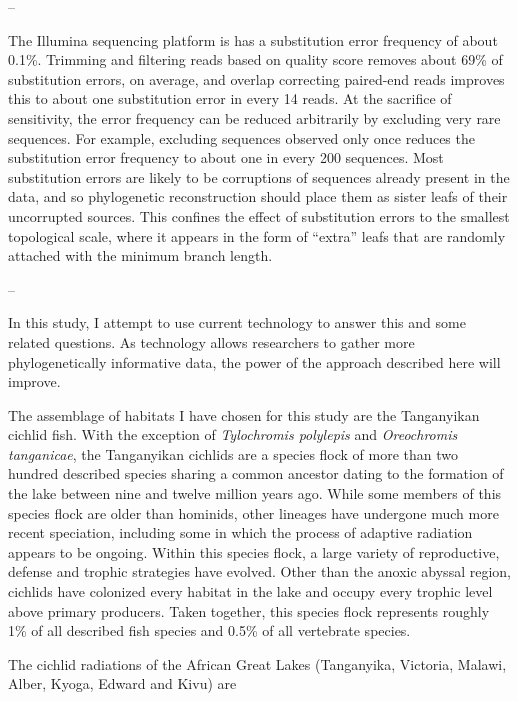 --

The Illumina sequencing platform is has a substitution error frequency of about 0.1\%. \cite{ross2013characterizing} Trimming and filtering reads based on quality score removes about 69\% of substitution errors, on average, \cite{schirmer2016illumina} and overlap correcting paired-end reads improves this to about one substitution error in every 14 reads. \cite{bolger2014trimmomatic} At the sacrifice of sensitivity, the error frequency can be reduced arbitrarily by excluding very rare sequences. For example, excluding sequences observed only once reduces the substitution error frequency to about one in every 200 sequences. Most substitution errors are likely to be corruptions of sequences already present in the data, and so phylogenetic reconstruction should place them as sister leafs of their uncorrupted sources. This confines the effect of substitution errors to the smallest topological scale, where it appears in the form of ``extra'' leafs that are randomly attached with the minimum branch length.

--

In this study, I attempt to use current technology to answer this and some related questions. As technology allows researchers to gather more phylogenetically informative data, the power of the approach described here will improve. 

The assemblage of habitats I have chosen for this study are the Tanganyikan cichlid fish. With the exception of {\em Tylochromis polylepis} and {\em Oreochromis tanganicae}, the Tanganyikan cichlids are a species flock of more than two hundred described species sharing a common ancestor dating to the formation of the lake between nine and twelve million years ago. While some members of this species flock are older than hominids, other lineages have undergone much more recent speciation, including some in which the process of adaptive radiation appears to be ongoing. Within this species flock, a large variety of reproductive, defense and trophic strategies have evolved. Other than the anoxic abyssal region, cichlids have colonized every habitat in the lake and occupy every trophic level above primary producers. Taken together, this species flock represents roughly 1\% of all described fish species and 0.5\% of all vertebrate species.

The cichlid radiations of the African Great Lakes (Tanganyika, Victoria, Malawi, Alber, Kyoga, Edward and Kivu) are 



